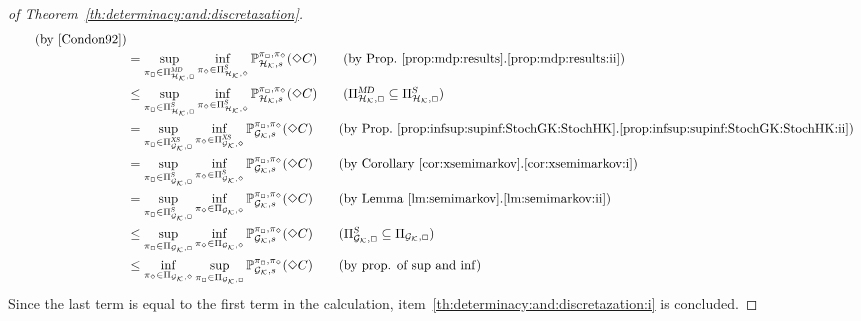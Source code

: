 \begin{proof}[of Theorem~\ref{th:determinacy:and:discretazation}]
\begin{align*}
    \tag{by \cite[Lemma 6]{Condon92}}\\
    & =
    \sup_{\strat_\maxplay\in\DetMemorylessStrats{\StochHK,\maxplay}}\inf_{\strat_\minplay\in\SemiMarkovStrats{\StochHK,\minplay}}\Prob^{\strat_{\maxplay},\strat_{\minplay}}_{\StochHK,s}(\Finally C)
    \tag{by Prop.~\ref{prop:mdp:results}.\ref{prop:mdp:results:ii}}\\
    & \leq
    \sup_{\strat_\maxplay\in\SemiMarkovStrats{\StochHK,\maxplay}}\inf_{\strat_\minplay\in\SemiMarkovStrats{\StochHK,\minplay}}\Prob^{\strat_{\maxplay},\strat_{\minplay}}_{\StochHK,s}(\Finally C)
    \tag{$\DetMemorylessStrats{\StochHK,\maxplay}\subseteq\SemiMarkovStrats{\StochHK,\maxplay}$}\\
    & =
    \sup_{\strat_\maxplay\in\XSemiMarkovStrats{\StochGK,\maxplay}}\inf_{\strat_\minplay\in\XSemiMarkovStrats{\StochGK,\minplay}}\Prob^{\strat_{\maxplay},\strat_{\minplay}}_{\StochGK,s}(\Finally C)
    \tag{by Prop.~\ref{prop:infsup:supinf:StochGK:StochHK}.\ref{prop:infsup:supinf:StochGK:StochHK:ii}}\\
    & =
    \sup_{\strat_\maxplay\in\SemiMarkovStrats{\StochGK,\maxplay}}\inf_{\strat_\minplay\in\SemiMarkovStrats{\StochGK,\minplay}}\Prob^{\strat_{\maxplay},\strat_{\minplay}}_{\StochGK,s}(\Finally C)
    \tag{by Corollary~\ref{cor:xsemimarkov}.\ref{cor:xsemimarkov:i}}\\
    & =
    \sup_{\strat_\maxplay\in\SemiMarkovStrats{\StochGK,\maxplay}}\inf_{\strat_\minplay\in\Strategies{\StochGK,\minplay}}\Prob^{\strat_{\maxplay},\strat_{\minplay}}_{\StochGK,s}(\Finally C)
    \tag{by Lemma~\ref{lm:semimarkov}.\ref{lm:semimarkov:ii}}\\
    & \leq
    \sup_{\strat_\maxplay\in\Strategies{\StochGK,\maxplay}}\inf_{\strat_\minplay\in\Strategies{\StochGK,\minplay}}\Prob^{\strat_{\maxplay},\strat_{\minplay}}_{\StochGK,s}(\Finally C)
    \tag{$\SemiMarkovStrats{\StochGK,\maxplay}\subseteq\Strategies{\StochGK,\maxplay}$}\\
    & \leq
    \inf_{\strat_\minplay\in\Strategies{\StochGK,\minplay}}\sup_{\strat_\maxplay\in\Strategies{\StochGK,\maxplay}}\Prob^{\strat_{\maxplay},\strat_{\minplay}}_{\StochGK,s}(\Finally C)
    \tag{by prop. of $\sup$ and $\inf$}
  \end{align*}
  Since the last term is equal to the first term in the calculation,
  item~\ref{th:determinacy:and:discretazation:i} is concluded.


\end{proof}
